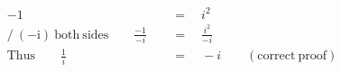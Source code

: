 \begin{align*}
-1\quad&\,=\quad i^2\\
\mathrm{/~(-i)~both~sides}\qquad\frac{-1}{-i}\quad&\,=\quad\frac{i^2}{-i}\\
\mathrm{Thus}\qquad\frac{1}{i}\quad&\,=\quad-i\qquad\mathrm{(correct~proof)}
\end{align*}
